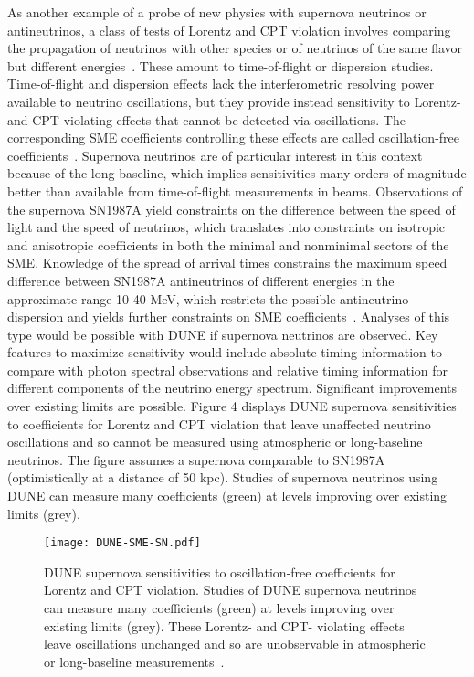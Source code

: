 As another example of a probe of new physics with supernova neutrinos or antineutrinos,
a class of tests of Lorentz and CPT violation involves comparing the propagation of neutrinos with other species or of neutrinos of the same flavor but different energies~\cite{Kostelecky:2003cr,Kostelecky:2003xn,Kostelecky:2011gq,Diaz:2009qk}. These amount to time-of-flight or dispersion studies.
Time-of-flight and dispersion effects lack the interferometric resolving power available to neutrino oscillations, but they provide instead sensitivity to Lorentz- and CPT-violating effects that cannot be detected via oscillations. The corresponding SME coefficients controlling these effects are called oscillation-free coefficients~\cite{Kostelecky:2011gq}.
Supernova neutrinos are of particular interest in this context because of the long baseline, which implies sensitivities many orders of magnitude better than available from time-of-flight measurements in beams. Observations of the supernova SN1987A yield constraints on the difference between the speed of light and the speed of neutrinos, which translates into constraints on isotropic and anisotropic coefficients in both the minimal and nonminimal sectors of the SME. Knowledge of the spread of arrival times constrains the maximum speed difference between SN1987A antineutrinos of different energies in the approximate range 10-40 MeV, which restricts the possible antineutrino dispersion and yields further constraints on SME coefficients~\cite{Kostelecky:2011gq}.
Analyses of this type would be possible with DUNE if supernova neutrinos are observed. Key features to maximize sensitivity would include absolute timing information to compare with photon spectral observations and relative timing information for different components of the neutrino energy spectrum. Significant improvements over existing limits are possible.
Figure 4 displays DUNE supernova sensitivities to coefficients for Lorentz and CPT violation that leave unaffected neutrino oscillations and so cannot be measured using atmospheric or long-baseline neutrinos. The figure assumes a supernova comparable to SN1987A (optimistically at a distance of 50 kpc). Studies of supernova neutrinos using DUNE can measure many coefficients (green) at levels improving over existing limits (grey).

\begin{figure}[!htb]
\centering
\texttt{[image: DUNE-SME-SN.pdf]}
\caption{DUNE supernova sensitivities to oscillation-free coefficients for Lorentz and CPT violation. Studies of DUNE supernova neutrinos can measure many coefficients (green) at levels improving over existing limits (grey). These Lorentz- and CPT- violating effects leave oscillations unchanged and so are unobservable in atmospheric or long-baseline measurements~\cite{kostelecky}.}
\label{fig:snliv}
\end{figure}

